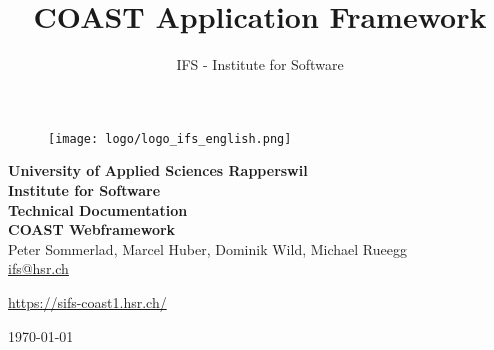 \documentclass[11pt,a4paper,oneside]{scrreprt}
\title{COAST Application Framework}
\author{IFS - Institute for Software}
\begin{document}
\begin{titlepage}

\thispagestyle{empty}

\begin{center}
\begin{figure}[h]
 \centering
 \texttt{[image: logo/logo\_ifs\_english.png]}
\end{figure}
\vspace{1,5cm}
{\Large \bfseries University of Applied Sciences Rapperswil\\}
\vspace{0,5cm}
{\Large \bfseries Institute for Software\\}
\vspace{2cm}
\sffamily
{\Huge \bfseries Technical Documentation}\\
\vspace{0.5cm}
{\Huge \bfseries COAST Webframework}\\
\vspace{1,5cm}
Peter Sommerlad, Marcel Huber, Dominik Wild, Michael Rueegg\\\url{ifs@hsr.ch}\\\vspace{1,0cm}
\begin{scriptsize}\url{https://sifs-coast1.hsr.ch/}\\\end{scriptsize}
\vspace{2,5cm}
\vspace{0,3cm}
\today
\end{center}
\end{titlepage}

\setcounter{tocdepth}{2}

\tableofcontents
\newpage
{}
\pagestyle{scrheadings}


%

\appendix

\cleardoublepage
{}
\listoffigures

\cleardoublepage
{}
\printnomenclature

\nocite{*}

\cleardoublepage
{}

\end{document}
